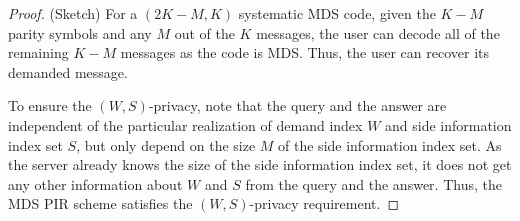 \documentclass[letterpaper, 10 pt, conference]{ieeeconf}
\newtheorem{lemma}{Lemma}
\begin{document}
\begin{proof}
(Sketch) For a $(2K - M, K)$ systematic MDS code, given the $K - M$ parity symbols and any $M$ out of the $K$ messages, the user can decode all of the remaining $K - M$ messages as the code is MDS. Thus, the user can recover its demanded message. 

To ensure the $(W,S)$-privacy, note that the query and the answer are independent of the particular realization of demand index $W$ and side information index set $S$, but only depend on the size $M$ of the side information index set. As the server already knows the size of the side information index set, it does not get any other information about $W$ and $S$ from the query and the answer. Thus, the MDS PIR scheme satisfies the $(W,S)$-privacy requirement.




\end{proof}
\end{document}
